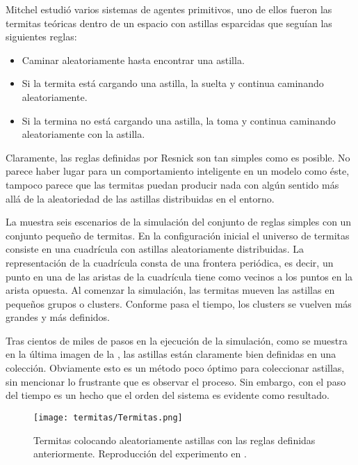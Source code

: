 Mitchel \cite{Resnick1994} estudió varios sistemas de agentes primitivos, uno de ellos fueron las termitas teóricas dentro de un espacio con astillas esparcidas que seguían las siguientes reglas:

\begin{itemize}
  \item Caminar aleatoriamente hasta encontrar una astilla.
  \item Si la termita está cargando una astilla, la suelta y continua caminando aleatoriamente.
  \item Si la termina no está cargando una astilla, la toma y continua caminando aleatoriamente con la astilla.
\end{itemize}

Claramente, las reglas definidas por Resnick son tan simples como es posible. No parece haber lugar para un comportamiento inteligente en un modelo como éste, tampoco parece que las termitas puedan producir nada con algún sentido más allá de la aleatoriedad de las astillas distribuidas en el entorno.\par

La  muestra seis escenarios de la simulación del conjunto de reglas simples con un conjunto pequeño de termitas. En la configuración inicial el universo de termitas consiste en una cuadrícula con astillas aleatoriamente distribuidas. La representación de la cuadrícula consta de una frontera periódica, es decir, un punto en una de las aristas de la cuadrícula tiene como vecinos a los puntos en la arista opuesta.
Al comenzar la simulación, las termitas mueven las astillas en pequeños grupos o clusters. Conforme pasa el tiempo, los clusters se vuelven más grandes y más definidos.\par

Tras cientos de miles de pasos en la ejecución de la simulación, como se muestra en la última imagen de la , las astillas están claramente bien definidas en una colección. Obviamente esto es un método poco óptimo para coleccionar astillas, sin mencionar lo frustrante que es observar el proceso. Sin embargo, con el paso del tiempo es un hecho que el orden del sistema es evidente como resultado.\par

\begin{figure}
  \centering
  \texttt{[image: termitas/Termitas.png]}
  \caption{Termitas colocando aleatoriamente astillas con las reglas definidas anteriormente.  Reproducción del experimento en \cite{Resnick1994}.}
  \label{fig:termitasaleatorias}
\end{figure}



